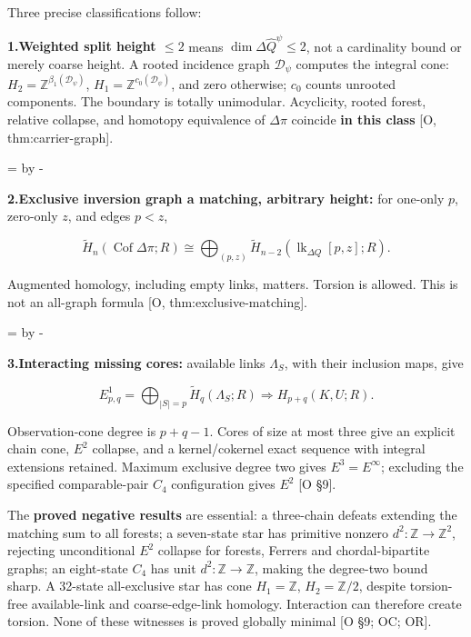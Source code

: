 \documentclass[10pt,letterpaper]{article}
\newcommand{\NeedDisplaySpace}{\par\begingroup\dimen0=\pagegoal\advance\dimen0 by -\pagetotal\ifdim\dimen0<8\baselineskip\newpage\fi\endgroup}
\begin{document}
Three precise classifications follow:\par

\noindent\textbf{1.}\quad \textbf{Weighted split height \(\le2\)} means \(\dim\Delta\widehat Q^\psi\le2\), not a cardinality bound or merely coarse height. A rooted incidence graph \(\mathcal D_\psi\) computes the integral cone: \(H_2=\mathbb Z^{\beta_1(\mathcal D_\psi)}\), \(H_1=\mathbb Z^{c_0(\mathcal D_\psi)}\), and zero otherwise; \(c_0\) counts unrooted components. The boundary is totally unimodular. Acyclicity, rooted forest, relative collapse, and homotopy equivalence of \(\Delta\pi\) coincide \textbf{in this class} [O, thm:carrier-graph].\par
\NeedDisplaySpace
\begin{samepage}
\noindent\textbf{2.}\quad \textbf{Exclusive inversion graph a matching, arbitrary height:} for one-only \(p\), zero-only \(z\), and edges \(p<z\),\par
\[
\widetilde H_n(\operatorname{Cof}\Delta\pi;R)
\cong\bigoplus_{(p,z)}\widetilde H_{n-2}
(\operatorname{lk}_{\Delta Q}[p,z];R).
\]
\end{samepage}
Augmented homology, including empty links, matters. Torsion is allowed. This is not an all-graph formula [O, thm:exclusive-matching].\par
\NeedDisplaySpace
\begin{samepage}
\noindent\textbf{3.}\quad \textbf{Interacting missing cores:} available links \(\Lambda_S\), with their inclusion maps, give\par
\[
E^1_{p,q}=\bigoplus_{|S|=p}\widetilde H_q(\Lambda_S;R)
\Longrightarrow H_{p+q}(K,U;R).
\]
\end{samepage}
Observation-cone degree is \(p+q-1\). Cores of size at most three give an explicit chain cone, \(E^2\) collapse, and a kernel/cokernel exact sequence with integral extensions retained. Maximum exclusive degree two gives \(E^3=E^\infty\); excluding the specified comparable-pair \(C_4\) configuration gives \(E^2\) [O \S{}9].\par

The \textbf{proved negative results} are essential: a three-chain defeats extending the matching sum to all forests; a seven-state star has primitive nonzero \(d^2:\mathbb Z\to\mathbb Z^2\), rejecting unconditional \(E^2\) collapse for forests, Ferrers and chordal-bipartite graphs; an eight-state \(C_4\) has unit \(d^2:\mathbb Z\to\mathbb Z\), making the degree-two bound sharp. A 32-state all-exclusive star has cone \(H_1=\mathbb Z\), \(H_2=\mathbb Z/2\), despite torsion-free available-link and coarse-edge-link homology. Interaction can therefore create torsion. None of these witnesses is proved globally minimal [O \S{}9; OC; OR].\par
\end{document}
